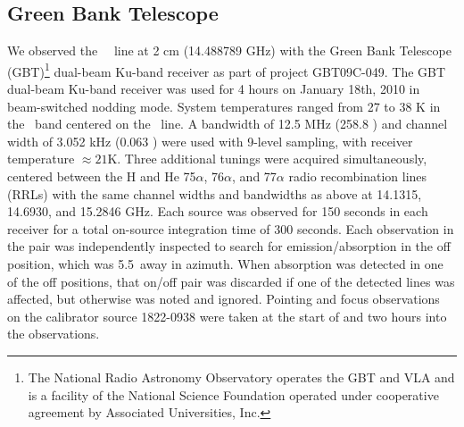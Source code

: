 





\subsection{Green Bank Telescope}
We observed the \formaldehyde\ \twotwo\ line at 2 cm (14.488789 GHz) with the
Green Bank Telescope (GBT)\footnote{ The National Radio Astronomy Observatory operates
the GBT and VLA and is a facility of the National Science Foundation operated
under cooperative agreement by Associated Universities, Inc.  } dual-beam
Ku-band receiver as part of project GBT09C-049.  The GBT dual-beam Ku-band
receiver was used for 4 hours on January 18th, 2010 in beam-switched nodding
mode.  System temperatures ranged from 27 to 38 K in the \formaldehyde\
band centered on the  \twotwo\ line. A bandwidth of 12.5 MHz
(258.8 \kms) and channel width of 3.052 kHz (0.063 \kms) were used with 9-level
sampling, with receiver temperature $\approx21$K.   Three additional tunings
were acquired simultaneously, centered between the H and He 75$\alpha$,
76$\alpha$, and 77$\alpha$ radio recombination lines (RRLs) with the same channel widths and
bandwidths as above at 14.1315, 14.6930, and 15.2846 GHz.  Each source was
observed for 150 seconds in each receiver for a total on-source integration
time of 300 seconds.  Each observation in the pair was independently inspected
to search for emission/absorption in the off position, which was 5.5\arcmin\
away in azimuth.  When absorption was detected in one of the off positions,
that on/off pair was discarded if one of the detected lines was affected, but
otherwise was noted and ignored.  Pointing and focus observations on the
calibrator source 1822-0938 were taken at the start of and two hours into the
observations.  

